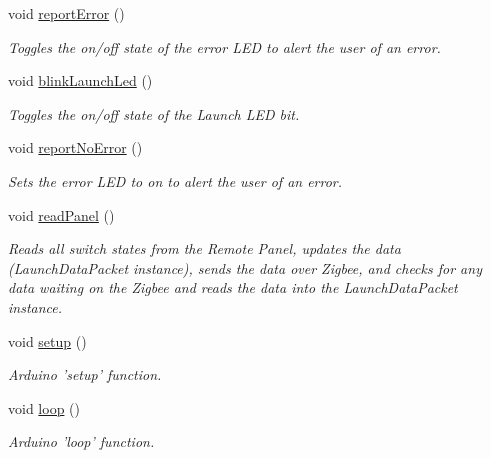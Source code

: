 \begin{DoxyCompactItemize}
void \hyperlink{remotePanel_8ino_a6a7a25d5c6ef2271b21f7f801484bd5e}{report\-Error} ()
\begin{DoxyCompactList}\small\item\em \-Toggles the on/off state of the error \-L\-E\-D to alert the user of an error. \end{DoxyCompactList}\item 
void \hyperlink{remotePanel_8ino_a0e5ef5e02f999a751b31aeb3ec0729b0}{blink\-Launch\-Led} ()
\begin{DoxyCompactList}\small\item\em \-Toggles the on/off state of the \-Launch \-L\-E\-D bit. \end{DoxyCompactList}\item 
void \hyperlink{remotePanel_8ino_a0d9f4635fcc1f60128d2c92c51afc234}{report\-No\-Error} ()
\begin{DoxyCompactList}\small\item\em \-Sets the error \-L\-E\-D to on to alert the user of an error. \end{DoxyCompactList}\item 
void \hyperlink{remotePanel_8ino_a875972e5579573df843bbc6cab825821}{read\-Panel} ()
\begin{DoxyCompactList}\small\item\em \-Reads all switch states from the \-Remote \-Panel, updates the data (\-Launch\-Data\-Packet instance), sends the data over \-Zigbee, and checks for any data waiting on the \-Zigbee and reads the data into the \-Launch\-Data\-Packet instance. \end{DoxyCompactList}\item 
void \hyperlink{remotePanel_8ino_a4fc01d736fe50cf5b977f755b675f11d}{setup} ()
\begin{DoxyCompactList}\small\item\em \-Arduino 'setup' function. \end{DoxyCompactList}\item 
void \hyperlink{remotePanel_8ino_afe461d27b9c48d5921c00d521181f12f}{loop} ()
\begin{DoxyCompactList}\small\item\em \-Arduino 'loop' function. \end{DoxyCompactList}\end{DoxyCompactItemize}
